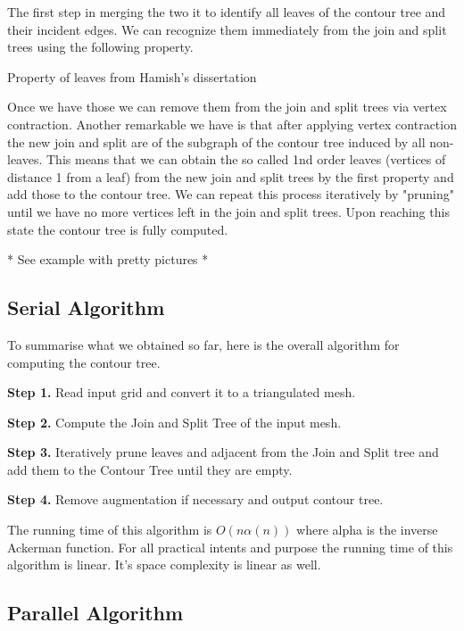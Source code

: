 The first step in merging the two it to identify all leaves of the contour tree and their incident edges. We can recognize them immediately from the join and split trees using the following property.

\begin{defn} Property of leaves from Hamish's dissertation   \end{defn}


Once we have those we can remove them from the join and split trees via vertex contraction. Another remarkable we have is that after applying vertex contraction the new join and split are of the subgraph of the contour tree induced by all non-leaves. This means that we can obtain the so called 1nd order leaves (vertices of distance 1 from a leaf) from the new join and split trees by the first property and add those to the contour tree. We can repeat this process iteratively by "pruning" until we have no more vertices left in the join and split trees. Upon reaching this state the contour tree is fully computed.

* See example with pretty pictures *

\subsection{Serial Algorithm}

To summarise what we obtained so far, here is the overall algorithm for computing the contour tree.

\textbf{Step 1.} Read input grid and convert it to a triangulated mesh.

\textbf{Step 2.} Compute the Join and Split Tree of the input mesh.

\textbf{Step 3.} Iteratively prune leaves and adjacent from the Join and Split tree and add them to the Contour Tree until they are empty.

\textbf{Step 4.} Remove augmentation if necessary and output contour tree.

The running time of this algorithm is $O(n\alpha(n))$ where alpha is the inverse Ackerman function. For all practical intents and purpose the running time of this algorithm is linear. It's space complexity is linear as well.

\subsection{Parallel Algorithm}

